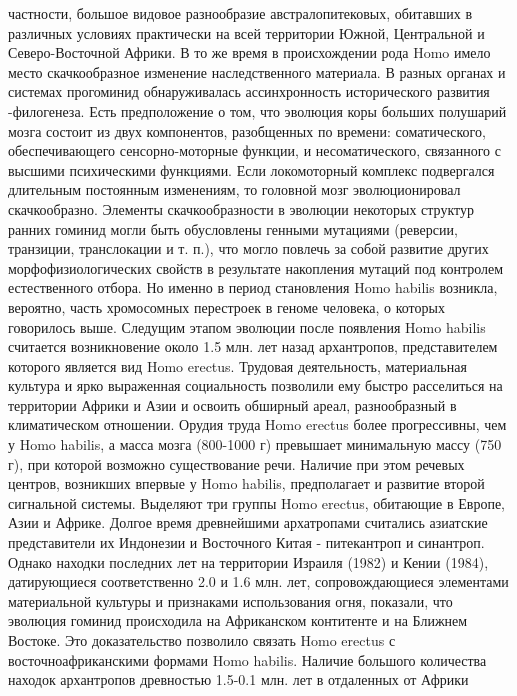 \documentclass[12pt]{article}
\begin{document}
частности, большое видовое разнообразие австралопитековых, обитавших в различных условиях практически
на всей территории Южной, Центральной и Северо-Восточной Африки. В то же время в происхождении рода
Homo имело место скачкообразное изменение наследственного материала.
В  разных  органах  и  системах  прогоминид  обнаруживалась  ассинхронность  исторического  развития  -филогенеза.  Есть  предположение  о  том,  что  эволюция  коры  больших  полушарий  мозга  состоит  из  двух
компонентов,  разобщенных  по  времени:  соматического,  обеспечивающего  сенсорно-моторные  функции,  и
несоматического, связанного с высшими психическими функциями. Если локомоторный комплекс подвергался
длительным  постоянным  изменениям,  то  головной  мозг  эволюционировал  скачкообразно.  Элементы
скачкообразности в
эволюции  некоторых  структур  ранних  гоминид  могли  быть  обусловлены  генными  мутациями  (реверсии,
транзиции, транслокации и т. п.), что могло повлечь за собой развитие других морфофизиологических свойств в
результате накопления мутаций под контролем естественного отбора. Но именно в период становления Homo
habilis возникла, вероятно, часть хромосомных перестроек в геноме человека, о которых говорилось выше. 
Следущим этапом эволюции после появления Homo habilis считается возникновение около 1.5 млн. лет назад
архантропов,  представителем  которого  является  вид  Homo  erectus.  Трудовая  деятельность,  материальная
культура и ярко выраженная социальность позволили ему быстро расселиться на территории Африки и Азии и
освоить  обширный  ареал,  разнообразный  в  климатическом  отношении.  Орудия  труда  Homo  erectus  более
прогрессивны, чем у Homo habilis, а масса мозга (800-1000 г) превышает минимальную массу (750 г), при
которой возможно существование речи. Наличие при этом речевых центров, возникших впервые у Homo habilis,
предполагает и развитие второй сигнальной системы.
Выделяют  три  группы  Homo  erectus,  обитающие  в  Европе,  Азии  и  Африке.  Долгое  время  древнейшими
архатропами считались азиатские представители их Индонезии и Восточного Китая - питекантроп и синантроп.
Однако находки последних лет на территории Израиля (1982) и Кении (1984), датирующиеся соответственно 2.0
и  1.6  млн. лет,  сопровождающиеся  элементами  материальной культуры и  признаками использования огня,
показали,  что  эволюция  гоминид  происходила  на  Африканском  контитенте  и  на  Ближнем  Востоке.  Это
доказательство позволило связать Homo erectus с восточноафриканскими формами Homo habilis.
Наличие большого количества находок архантропов древностью 1.5-0.1 млн. лет в отдаленных от Африки
\end{document}
